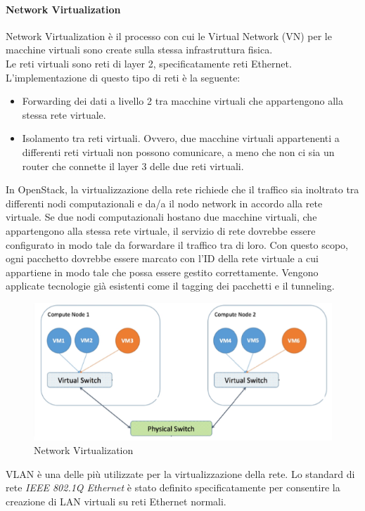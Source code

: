 \documentclass{article}
\begin{document}
\paragraph{Network Virtualization}
Network Virtualization è il processo con cui le Virtual Network (VN) per le macchine virtuali sono create sulla stessa infrastruttura fisica. \\
Le reti virtuali sono reti di layer 2, specificatamente reti Ethernet. L'implementazione di questo tipo di reti è la seguente:
\begin{itemize}
    \item Forwarding dei dati a livello 2 tra macchine virtuali che appartengono alla stessa rete virtuale.
    \item Isolamento tra reti virtuali. Ovvero, due macchine virtuali appartenenti a differenti reti virtuali non possono comunicare, a meno che non ci sia un router che connette il layer 3 delle due reti virtuali.
\end{itemize}
In OpenStack, la virtualizzazione della rete richiede che il traffico sia inoltrato tra differenti nodi computazionali e da/a il nodo network in accordo alla rete virtuale. Se due nodi computazionali hostano due macchine virtuali, che appartengono alla stessa rete virtuale, il servizio di rete dovrebbe essere configurato in modo tale da forwardare il traffico tra di loro. Con questo scopo, ogni pacchetto dovrebbe essere marcato con l'ID della rete virtuale a cui appartiene in modo tale che possa essere gestito correttamente. Vengono applicate tecnologie già esistenti come il tagging dei pacchetti e il tunneling.
\begin{figure}[H]
    \centering
    \includegraphics[scale=0.5]{img/network virtualization.png}
    \caption{Network Virtualization}
\end{figure}\noindent
VLAN è una delle più utilizzate per la virtualizzazione della rete. Lo standard di rete \textit{IEEE 802.1Q Ethernet} è stato definito specificatamente per consentire la creazione di LAN virtuali su reti Ethernet normali. \\
\end{document}
